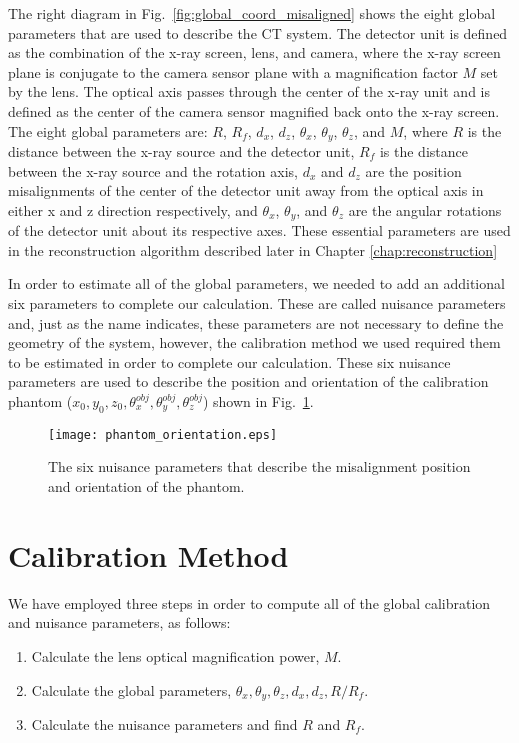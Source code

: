 The right diagram in Fig.~\ref{fig:global_coord_misaligned} shows the eight global parameters that are used to describe the CT system.  The detector unit is defined as the combination of the x-ray screen, lens, and camera, where the x-ray screen plane is conjugate to the camera sensor plane with a magnification factor $M$ set by the lens.  The optical axis passes through the center of the x-ray unit and is defined as the center of the camera sensor magnified back onto the x-ray screen.  The eight global parameters are: $R$, $R_f$, $d_x$, $d_z$, $\theta_x$, $\theta_y$, $\theta_z$, and $M$, where $R$ is the distance between the x-ray source and the detector unit, $R_f$ is the distance between the x-ray source and the rotation axis, $d_x$ and $d_z$ are the position misalignments of the center of the detector unit away from the optical axis in either x and z direction respectively, and $\theta_x$, $\theta_y$, and $\theta_z$ are the angular rotations of the detector unit about its respective axes.  These essential parameters are used in the reconstruction algorithm described later in Chapter \ref{chap:reconstruction}

In order to estimate all of the global parameters, we needed to add an additional six parameters to complete our calculation.  These are called nuisance parameters and, just as the name indicates, these parameters are not necessary to define the geometry of the system, however, the calibration method we used required them to be estimated in order to complete our calculation.  These six nuisance parameters are used to describe the position and orientation of the calibration phantom ($x_0, y_0, z_0, \theta^{obj}_x, \theta_y^{obj}, \theta_z^{obj}$) shown in Fig.~\ref{fig:phantom_orientation}.  

\begin{figure}[ht]
\centering
\texttt{[image: phantom\_orientation.eps]}
\caption{The six nuisance parameters that describe the misalignment position and orientation of the phantom.}
\label{fig:phantom_orientation}
\end{figure}

\section{Calibration Method}
\label{section:calibration_method}
We have employed three steps in order to compute all of the global calibration and nuisance parameters, as follows:

\begin{enumerate}
\item Calculate the lens optical magnification power, $M$.
\item Calculate the global parameters, $\theta_x, \theta_y, \theta_z, d_x, d_z, R/R_f$.
\item Calculate the nuisance parameters and find $R$ and $R_f$.
\end{enumerate}

